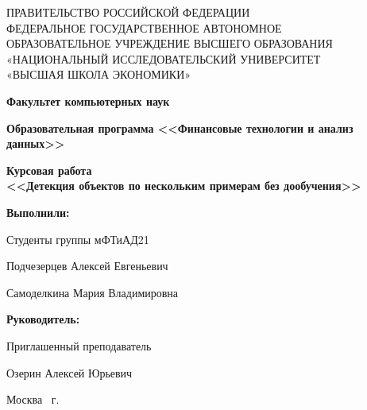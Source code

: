 \begin{titlepage}
    \begin{center}
        ПРАВИТЕЛЬСТВО РОССИЙСКОЙ ФЕДЕРАЦИИ \\
        ФЕДЕРАЛЬНОЕ ГОСУДАРСТВЕННОЕ АВТОНОМНОЕ \\
        ОБРАЗОВАТЕЛЬНОЕ УЧРЕЖДЕНИЕ ВЫСШЕГО ОБРАЗОВАНИЯ\\
        «НАЦИОНАЛЬНЫЙ ИССЛЕДОВАТЕЛЬСКИЙ УНИВЕРСИТЕТ\\
        «ВЫСШАЯ ШКОЛА ЭКОНОМИКИ»
    \end{center}

    \begin{center}
        \textbf{Факультет компьютерных наук}

        \textbf{Образовательная программа <<Финансовые технологии и анализ данных>>}


    \end{center}
    \vspace{1ex}

    \begin{center}
        \textbf{Курсовая работа \\
            <<Детекция объектов по нескольким примерам без дообучения>>
        }
    \end{center}

    \vspace{2ex}
    \vfill

    \vspace{2ex}

    \begin{flushright}
        \textbf{Выполнили:}

        \vspace{2ex}

        Студенты группы мФТиАД21

        \vspace{2ex}
        
        Подчезерцев Алексей Евгеньевич

        Самоделкина Мария Владимировна

        \vspace{2ex}
        \textbf{Руководитель:}

        Приглашенный преподаватель

        Озерин Алексей Юрьевич

    \end{flushright}

    \vspace{5ex}
    \begin{center}
        Москва \the\year \, г.
    \end{center}

\end{titlepage}
\addtocounter{page}{1}